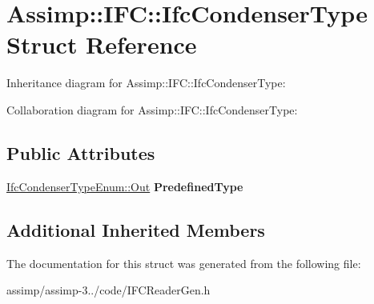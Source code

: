 \hypertarget{struct_assimp_1_1_i_f_c_1_1_ifc_condenser_type}{\section{Assimp\+:\+:I\+F\+C\+:\+:Ifc\+Condenser\+Type Struct Reference}
\label{struct_assimp_1_1_i_f_c_1_1_ifc_condenser_type}
}


Inheritance diagram for Assimp\+:\+:I\+F\+C\+:\+:Ifc\+Condenser\+Type\+:


Collaboration diagram for Assimp\+:\+:I\+F\+C\+:\+:Ifc\+Condenser\+Type\+:
\subsection*{Public Attributes}
\begin{DoxyCompactItemize}
\item 
\hypertarget{struct_assimp_1_1_i_f_c_1_1_ifc_condenser_type_a74eba7726e7e17b9769522522c76b822}{\hyperlink{classboost_1_1shared__ptr}{Ifc\+Condenser\+Type\+Enum\+::\+Out} {\bfseries Predefined\+Type}}\label{struct_assimp_1_1_i_f_c_1_1_ifc_condenser_type_a74eba7726e7e17b9769522522c76b822}

\end{DoxyCompactItemize}
\subsection*{Additional Inherited Members}


The documentation for this struct was generated from the following file\+:\begin{DoxyCompactItemize}
\item 
assimp/assimp-\/3../code/I\+F\+C\+Reader\+Gen.\+h\end{DoxyCompactItemize}
